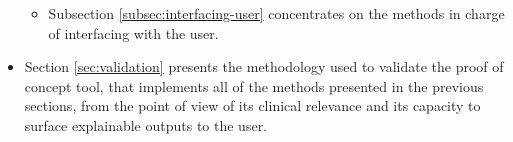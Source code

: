 \begin{itemize}
\begin{itemize}
  		\item Subsection \ref{subsec:interfacing-user} concentrates on the methods in charge of interfacing with the user.
	\end{itemize}
	\item Section \ref{sec:validation} presents the methodology used to validate the proof of concept tool, that implements all of the methods presented in the previous sections, from the point of view of its clinical relevance and its capacity to surface explainable outputs to the user.
\end{itemize}